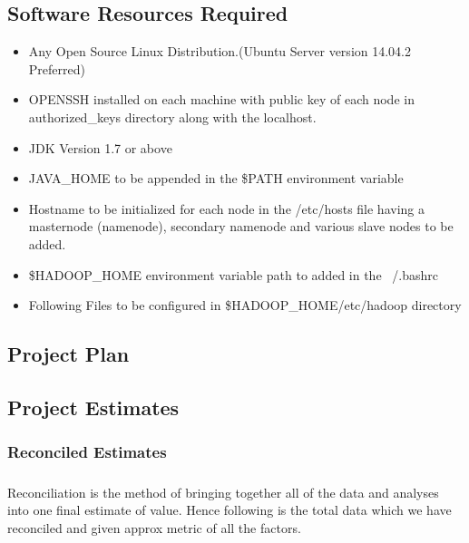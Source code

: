 \documentclass[oneside,a4paper,12pt]{report}
\begin{document}
\section{Software Resources Required}
\begin{itemize}
\item Any Open Source Linux Distribution.(Ubuntu Server version 14.04.2 Preferred)
\item OPENSSH installed on each machine with public key of each node in authorized\_keys directory along with the localhost.
\item JDK Version 1.7 or above
\item JAVA\_HOME to be appended in the \$PATH environment variable
\item Hostname to be initialized for each node in the /etc/hosts file having a masternode (namenode), secondary namenode and various slave nodes to be added.
\item \$HADOOP\_HOME environment variable path to added in the ~/.bashrc 
\item Following Files to be configured in \$HADOOP\_HOME/etc/hadoop directory
\end{itemize}


\begin{center}
\chapter{Project Plan}
\newpage
\end{center}
\section{Project Estimates}

\subsection{Reconciled Estimates}
\paragraph{}
Reconciliation is the method of bringing together all of the data and analyses into one final estimate of value. Hence following is the total data which we have reconciled and given approx metric of all the factors. \\
\end{document}
